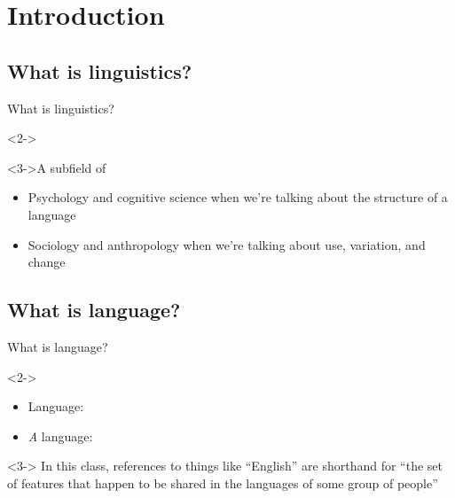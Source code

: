 \documentclass{beamer}
\newcommand{\subtwoone}{What is linguistics?}
\newcommand{\subtwotwo}{What is language?}
\begin{document}
  \section{Introduction}
    \subsection{\subtwoone}
      \begin{frame}{\subtwoone}
        \begin{definition}<2->
          
        \end{definition}
        \begin{block}<3->{A subfield of}
          \begin{itemize}
            \item Psychology and cognitive science when we're talking about the structure of a language
            \item Sociology and anthropology when we're talking about use, variation, and change
          \end{itemize}
        \end{block}
      \end{frame}

    \subsection{\subtwotwo}
      \begin{frame}{\subtwotwo}
        \begin{definition}<2->{}
          \begin{itemize}
            \item \alert{Language}: 
            \item \alert{\emph{A} language}: 
          \end{itemize}
        \end{definition}
        \begin{alertblock}<3->{}
          In this class, references to things like ``English'' are shorthand for ``the set of features that happen to be shared in the languages of some group of people''
        \end{alertblock}
      \end{frame}
\end{document}
